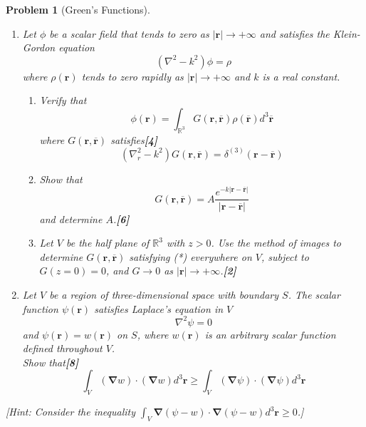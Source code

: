 \documentclass[a4paper]{article}
\theoremstyle{new}
\newtheorem{qns}{Problem}[section]
\begin{document}
\begin{qns}[Green's Functions]\leavevmode
\begin{enumerate}[label=(\alph*)]
\item Let $\phi$ be a scalar field that tends to zero as $|\mathbf{r}|\rightarrow+\infty$ and satisfies the Klein-Gordon equation
$$(\nabla^2-k^2)\phi=\rho$$
where $\rho(\mathbf{r})$ tends to zero rapidly as $|\mathbf{r}|\rightarrow+\infty$ and $k$ is a real constant.
\begin{enumerate}[label=(\roman*)]
\item Verify that
$$\phi(\mathbf{r})=\int_{\mathbb{R}^3}G(\mathbf{r},\overline{\mathbf{r}})\rho(\overline{\mathbf{r}})d^3\mathbf{\overline{r}}$$
where $G(\mathbf{r},\mathbf{\overline{r}})$ satisfies\hfill\textbf{[4]}
\begin{equation}
(\nabla_r^2-k^2)G(\mathbf{r},\mathbf{\overline{r}})=\delta^{(3)}(\mathbf{r}-\mathbf{\overline{r}})\tag{*}
\end{equation}
\item Show that
$$G(\mathbf{r},\mathbf{\overline{r}})=A\frac{e^{-k|\mathbf{r}-\mathbf{\overline{r}|}}}{|\mathbf{r}-\mathbf{\overline{r}}|}$$
and determine $A$.\hfill\textbf{[6]}
\item Let $V$ be the half plane of $\mathbb{R}^3$ with $z > 0$. Use the method of images to determine $G(\mathbf{r},\mathbf{\overline{r}})$ satisfying (*) everywhere on $V$, subject to $G(z=0)=0$, and $G\rightarrow0$ as $|\mathbf{r}|\rightarrow+\infty$.\hfill\textbf{[2]}
\end{enumerate}
\item Let $V$ be a region of three-dimensional space with boundary $S$. The scalar function $\psi(\mathbf{r})$ satisfies Laplace’s equation in $V$
$$\nabla^2\psi=0$$
and $\psi(\mathbf{r})=w(\mathbf{r})$ on $S$, where $w(\mathbf{r})$ is an arbitrary scalar function defined throughout $V$.\\[5pt]
Show that\hfill\textbf{[8]}
$$\int_V(\boldsymbol{\nabla}w)\cdot(\boldsymbol{\nabla}w)d^3\mathbf{r}\geq\int_V(\boldsymbol{\nabla}\psi)\cdot(\boldsymbol{\nabla}\psi)d^3\mathbf{r}$$
\end{enumerate}
[Hint: Consider the inequality $\int_V\boldsymbol{\nabla}(\psi-w)\cdot\boldsymbol{\nabla}(\psi-w)d^3\mathbf{r}\geq0$.]
\end{qns}
\newpage
\end{document}
